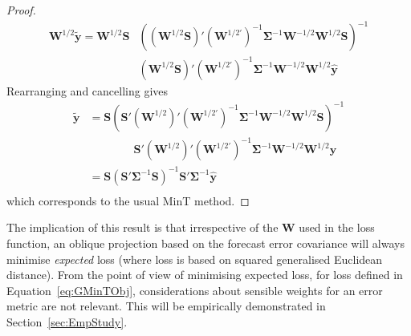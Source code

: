 \documentclass[12pt]{article}
\theoremstyle{definition}
\begin{document}
{\begin{proof}
	\begin{align*}
	\bm{W}^{1/2}\tilde{\bm{y}}=\bm{W}^{1/2}\bm{S}&\left((\bm{W}^{1/2}\bm{S})'(\bm{W}^{1/2'})^{-1}\bm{\Sigma}^{-1}\bm{W}^{-1/2}\bm{W}^{1/2}\bm{S}\right)^{-1}\\
	&(\bm{W}^{1/2}\bm{S})'(\bm{W}^{1/2'})^{-1}\bm{\Sigma}^{-1}\bm{W}^{-1/2}\bm{W}^{1/2}\hat{\bm{y}}
	\end{align*}
	Rearranging and cancelling gives
	\begin{align*}
    \tilde{\bm{y}}&=\bm{S}\left(\bm{S}'(\bm{W}^{1/2})'(\bm{W}^{1/2'})^{-1}\bm{\Sigma}^{-1}\bm{W}^{-1/2}\bm{W}^{1/2}\bm{S}\right)^{-1}\\
    &\qquad\qquad\bm{S}'(\bm{W}^{1/2})'(\bm{W}^{1/2'})^{-1}\bm{\Sigma}^{-1}\bm{W}^{-1/2}\bm{W}^{1/2}\hat{\bm{y}}\\
	&=\bm{S}\left(\bm{S}'\bm{\Sigma}^{-1}\bm{S}\right)^{-1}\bm{S}'\bm{\Sigma}^{-1}\hat{\bm{y}}\\
	\end{align*}
	which corresponds to the usual MinT method.
\end{proof}

The implication of this result is that irrespective of the ${\bm W}$ used in the loss function, an oblique projection based on the forecast error covariance will always minimise {\em expected} loss (where loss is based on squared generalised Euclidean distance).  From the point of view of minimising expected loss, for loss defined in Equation~\ref{eq:GMinTObj}, considerations about sensible weights for an error metric are not relevant.  This will be empirically demonstrated in Section~\ref{sec:EmpStudy}.





}
\end{document}
